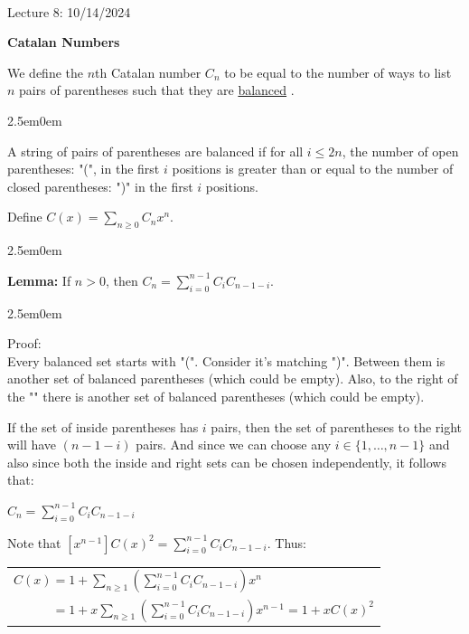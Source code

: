 \documentclass{book}
\newcommand{\hOne}{%
   \color{Black}%
   \fontsize{14}{16}\selectfont%
}
\newcommand{\hTwo}{%
\color{MidnightBlue}%
   \fontsize{13}{15}\selectfont%
}
\newcommand{\hThree}{%
   \color{PineGreen!85!Orange}
   \fontsize{12}{14}\selectfont%
}
\newenvironment{myIndent}{%
   \begin{adjustwidth}{2.5em}{0em}%
}{%
   \end{adjustwidth}%
}
\newcommand{\udefine}[1]{{%
   \setulcolor{Red}%
   \setul{0.14em}{0.07em}%
   \ul{#1}%
}}
\newcommand{\blab}[1]{\textbf{#1}}
\newcommand{\mySepTwo}[1][.]{%
   {\noindent\color{#1}{\rule{6.5in}{0.5mm}}}\\%
}
\newcommand{\retTwo}{\hfill\bigbreak}
\newcommand{\mHeader}[1]{{
   \color{Black}%
   \fontsize{20}{18}\selectfont%
   #1\retTwo
}}
\begin{document}
\hOne\mySepTwo

\mHeader{Lecture 8: 10/14/2024}

\blab{Catalan Numbers}

We define the $n$th Catalan number $C_n$ to be equal to the number of ways to list $n$ pairs of parentheses such that they are \udefine{balanced}.

\begin{myIndent}
   A string of pairs of parentheses are balanced if for all $i \leq 2n$, the number of open parentheses: "(", in the first $i$ positions is greater than or equal to the number of closed parentheses: ")" in the first $i$ positions.\retTwo
\end{myIndent}

Define $C(x) = \sum\limits_{ n \geq 0}C_n x^n$.


\begin{myIndent}\hTwo
   \blab{Lemma:} If $n > 0$, then $C_n = \sum\limits_{i=0}^{n-1}C_iC_{n-1-i}$.

   
   \begin{myIndent}\hThree
      Proof:\\
      Every balanced set starts with "(". Consider it's matching ")". Between them is\\ another set of balanced parentheses (which could be empty). Also, to the right of the "\rparen" there is another set of balanced parentheses (which could be empty).\retTwo

      If the set of inside parentheses has $i$ pairs, then the set of parentheses to the right will have $(n-1-i)$ pairs. And since we can choose any $i \in \{1, \ldots, n-1\}$ and also since both the inside and right sets can be chosen independently, it follows that:

      {\centering $C_n = \sum\limits_{i=0}^{n-1}C_iC_{n-1-i}$ \newpage\par}
   \end{myIndent}

   Note that $[x^{n-1}]C(x)^2 = \sum\limits_{i=0}^{n-1} C_iC_{n-1-i}$. Thus:\\ [6pt]

   {\centering 
   \begin{tabular}{l}
      $C(x) = 1 + \sum\limits_{n \geq 1}\left(\sum\limits_{i=0}^{n-1}C_iC_{n-1-i}\right)x^n$\\ [14pt]
      $\phantom{C(x)} = 1 + x\sum\limits_{n \geq 1}\left(\sum\limits_{i=0}^{n-1}C_iC_{n-1-i}\right)x^{n-1} = 1 + xC(x)^2$
   \end{tabular} \retTwo\par}


\end{myIndent}
\end{document}
